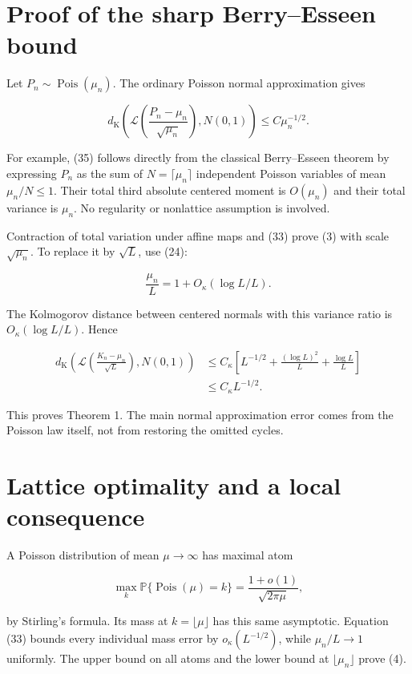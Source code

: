 \documentclass[
  11pt,
]{article}
\begin{document}
\section{Proof of the sharp Berry--Esseen
bound}\label{proof-of-the-sharp-berryesseen-bound}

Let \(P_n\sim\operatorname{Pois}(\mu_n)\). The ordinary Poisson normal
approximation gives

\[
 d_{\mathrm K}\!\left(
 \mathcal L\!\left(\frac{P_n-\mu_n}{\sqrt{\mu_n}}\right),N(0,1)\right)
 \le C\mu_n^{-1/2}.
\tag{35}
\]

For example, (35) follows directly from the classical Berry--Esseen
theorem by expressing \(P_n\) as the sum of \(N=\lceil\mu_n\rceil\)
independent Poisson variables of mean \(\mu_n/N\le1\). Their total third
absolute centered moment is \(O(\mu_n)\) and their total variance is
\(\mu_n\). No regularity or nonlattice assumption is involved.

Contraction of total variation under affine maps and (33) prove (3) with
scale \(\sqrt{\mu_n}\). To replace it by \(\sqrt L\), use (24):

\[
 \frac{\mu_n}{L}=1+O_\kappa(\log L/L).
\]

The Kolmogorov distance between centered normals with this variance
ratio is \(O_\kappa(\log L/L)\). Hence

\[
\begin{split}
 d_{\mathrm K}\!\left(
 \mathcal L\!\left(\frac{K_n-\mu_n}{\sqrt L}\right),N(0,1)\right)
 &\le C_\kappa\left[
 L^{-1/2}+\frac{(\log L)^2}{L}+\frac{\log L}{L}\right]\\
 &\le C_\kappa L^{-1/2}.
\end{split}
\tag{36}
\]

This proves Theorem 1. The main normal approximation error comes from
the Poisson law itself, not from restoring the omitted cycles.

\section{Lattice optimality and a local
consequence}\label{lattice-optimality-and-a-local-consequence}

A Poisson distribution of mean \(\mu\to\infty\) has maximal atom

\[
 \max_k\mathbb P\{\operatorname{Pois}(\mu)=k\}
 =\frac{1+o(1)}{\sqrt{2\pi\mu}},
\]

by Stirling's formula. Its mass at \(k=\lfloor\mu\rfloor\) has this same
asymptotic. Equation (33) bounds every individual mass error by
\(o_\kappa(L^{-1/2})\), while \(\mu_n/L\to1\) uniformly. The upper bound
on all atoms and the lower bound at \(\lfloor\mu_n\rfloor\) prove (4).
\end{document}
